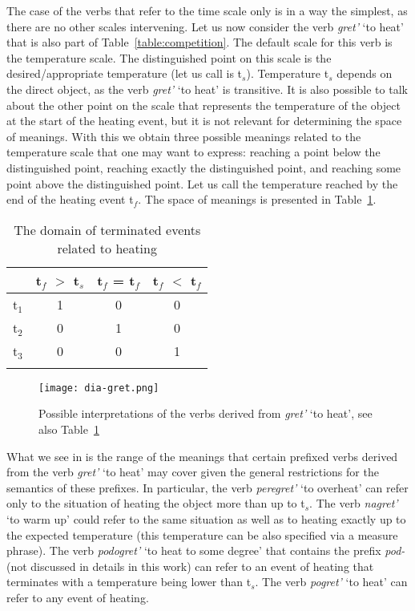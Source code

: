 The case of the verbs that refer to the time scale only is in a way the simplest, as there are no other scales intervening. Let us now consider the verb \textit{gret'} `to heat' that is also part of Table~\ref{table:competition}. The default scale for this verb is the temperature scale. The distinguished point on this scale is the desired/appropriate temperature (let us call is t$_s$). Temperature t$_s$ depends on the direct object, as the verb \textit{gret'} `to heat' is transitive. It is also possible to talk about the other point on the scale that represents the temperature of the object at the start of the heating event, but it is not relevant for determining the space of meanings. With this we obtain three possible meanings related to the temperature scale that one may want to express: reaching a point below the distinguished point, reaching exactly the distinguished point, and reaching some point above the distinguished point. Let us call the temperature reached by the end of the heating event t$_f$. The space of meanings is presented in Table~\ref{table:gret}.

\begin{table}
\caption{The domain of terminated events related to heating \label{table:gret}}
\begin{tabular}{lccc}
\lsptoprule
 & t$_f$ $>$ t$_s$ & t$_f$ = t$_f$ & t$_f$ $<$ t$_f$\\
\midrule
t$_1$ & 1 & 0 & 0\\
t$_2$ & 0 & 1 & 0\\
t$_3$ & 0 & 0 & 1\\
\lspbottomrule
\end{tabular}
\end{table}

\begin{figure}
\centering
\texttt{[image: dia-gret.png]}
\caption{Possible interpretations of the verbs derived from \textit{gret'} `to heat', see also Table~\ref{table:gret} \label{fig:gret}}
\end{figure}

What we see in  is the range of the meanings that certain prefixed verbs derived from the verb \textit{gret'} `to heat' may cover given the general restrictions for the semantics of these prefixes. In particular, the verb \textit{peregret'} `to overheat' can refer only to the situation of heating the object more than up to t$_s$. The verb \textit{nagret'} `to warm up' could refer to the same situation as well as to heating exactly up to the expected temperature (this temperature can be also specified via a measure phrase). The verb \textit{podogret'} `to heat to some degree' that contains the prefix \textit{pod-} (not discussed in details in this work) can refer to an event of heating that terminates with a temperature being lower than t$_s$. The verb \textit{pogret'} `to heat' can refer to any event of heating.


